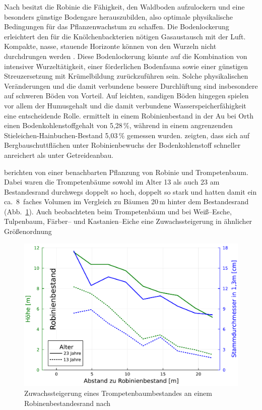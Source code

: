 \documentclass[twocolumn]{scrartcl}
\begin{document}
Nach
\citet{albert1926robinieBodenlockerheit,penschuck1931robinieBodenphysik}
besitzt die Robinie die Fähigkeit, den Waldboden aufzulockern und eine
besonders günstige Bodengare herauszubilden, also optimale
physikalische Bedingungen für das Pflanzenwachstum zu schaffen.  Die
Bodenlockerung erleichtert den für die Knölchenbackterien nötigen
Gasaustausch mit der Luft.  Kompakte, nasse, stauende Horizonte können
von den Wurzeln nicht durchdrungen werden \citep{mueller1991robinie}.
Diese Bodenlockerung könnte auf die Kombination von intensiver
Wurzeltätigkeit, einer förderlichen Bodenfauna sowie einer günstigen
Streuzersetzung mit Krümelbildung zurückzuführen sein. Solche
physikalischen Veränderungen und die damit verbundene bessere
Durchlüftung sind insbesondere auf schweren Böden von Vorteil. Auf
leichten, sandigen Böden hingegen spielen vor allem der Humusgehalt
und die damit verbundene Wasserspeicherfähigkeit eine entscheidende
Rolle. \citet{kastler2013robinieBoden} ermittelt in einem
Robinienbestand in der Au bei Orth einen Bodenkohlenstoffgehalt von
5,28\,\%, während in einem angrenzenden Stieleichen-Hainbuchen-Bestand
5,03\,\% gemessen wurden. \citet{Kanzler2021robinieBodenc} zeigten,
dass sich auf Bergbauschuttflächen unter Robinienbewuchs der
Bodenkohlenstoff schneller anreichert als unter Getreideanbau.

\citet{ferguson1922robinie,mcintyre1932robinie,chapman1935robinie}
berichten von einer benachbarten Pflanzung von Robinie und
Trompetenbaum. Dabei waren die Trompetenbäume sowohl im Alter 13 als
auch 23 am Bestandesrand durchwegs doppelt so hoch, doppelt so stark
und hatten damit ein ca.\ 8~faches Volumen im Vergleich zu Bäumen
20\,m hinter dem Bestandesrand (Abb.~\ref{fig:bestandesrand}). Auch
\citet{mcintyre1932robinie} beobachteten beim Trompetenbäum und
\citet{chapman1935robinie} bei Weiß--Esche, Tulpenbaum, Färber-- und
Kastanien--Eiche eine Zuwachssteigerung in ähnlicher Größenordnung

\begin{figure}[htbp]
  \centering
  \includegraphics[width=.9\linewidth]{./bild/bestandesrand}
  \caption{Zuwachssteigerung eines Trompetenbaumbestandes an einem
    Robinenbestandesrand nach
    \citet{ferguson1922robinie,chapman1935robinie}}
  \label{fig:bestandesrand}
\end{figure}
\end{document}
